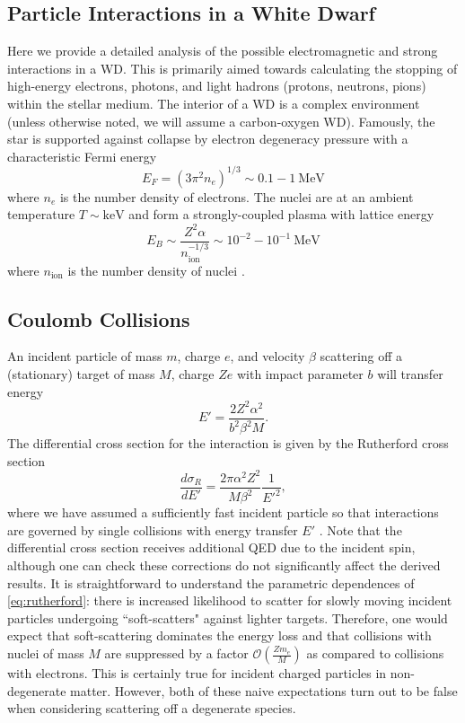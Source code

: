 \documentclass[twocolumn,showpacs,preprintnumbers,amsmath,amssymb,prd]{revtex4}
\newcommand{\OO}{\mathcal{O}}
\def\r{\right)}
\def\l{\left(}
\begin{document}
\begin{appendices}

\section{Particle Interactions in a White Dwarf}
\label{sec:appendix}
Here we provide a detailed analysis of the possible electromagnetic and strong interactions in a WD. This is primarily aimed towards calculating the stopping of high-energy electrons, photons, and light hadrons (protons, neutrons, pions) within the stellar medium. The interior of a WD is a complex environment (unless otherwise noted, we will assume a carbon-oxygen WD). Famously, the star is supported against collapse by electron degeneracy pressure with a characteristic Fermi energy
\begin{equation}
E_F = (3 \pi^2 n_e)^{1/3} \sim 0.1 - 1 ~\text{MeV}
\end{equation}
where $n_e$ is the number density of electrons. The nuclei are at an ambient temperature $T \sim \text{keV}$ and form a strongly-coupled plasma with lattice energy
\begin{equation}
\label{eq:lattice}
E_B \sim \frac{Z^2 \alpha}{n_\text{ion}^{-1/3}} \sim 10^{-2} - 10^{-1} ~\text{MeV}
\end{equation}
where $n_\text{ion}$ is the number density of nuclei \cite{Teukolsky}. 

\subsection*{Coulomb Collisions}

An incident particle of mass $m$, charge $e$, and velocity $\beta$ scattering off a (stationary) target of mass $M$, charge $Ze$ with impact parameter $b$ will transfer energy
\begin{equation}
\label{eq:impact}
E' = \frac{2 Z^2 \alpha^2}{b^2 \beta ^2 M}.
\end{equation}
The differential cross section for the interaction is given by the Rutherford cross section
\begin{equation}
\label{eq:rutherford}
\frac{d \sigma_R}{dE'} = \frac{2 \pi  \alpha^2 Z^2}{M \beta^2} \frac{1}{E'^2},
 \end{equation}
where we have assumed a sufficiently fast incident particle so that interactions are governed by single collisions with energy transfer $E'$ \cite{Agashe:2014kda}.  Note that the differential cross section receives additional QED due to the incident spin, although one can check these corrections do not significantly affect the derived results. It is straightforward to understand the parametric dependences of \eqref{eq:rutherford}: there is increased likelihood to scatter for slowly moving incident particles undergoing ``soft-scatters" against lighter targets. Therefore, one would expect that soft-scattering dominates the energy loss and that collisions with nuclei of mass $M$ are suppressed by a factor $\OO\l\frac{Z m_e}{M}\r$ as compared to collisions with electrons. This is certainly true for incident charged particles in non-degenerate matter. However, both of these naive expectations turn out to be false when considering scattering off a degenerate species.


\end{appendices}
\end{document}
